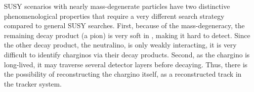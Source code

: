 SUSY scenarios with nearly mass-degenerate particles have two distinctive phenomenological properties that require a very different search strategy compared to general SUSY searches. 
First, because of the mass-degeneracy, the remaining decay product (\eg a pion) is very soft in \pt, making it hard to detect.
Since the other decay product, the neutralino, is only weakly interacting, it is very difficult to identify charginos via their decay products. 
Second, as the chargino is long-lived, it may traverse several detector layers before decaying.
Thus, there is the possibility of reconstructing the chargino itself, \eg as a reconstructed track in the tracker system.
 \\


